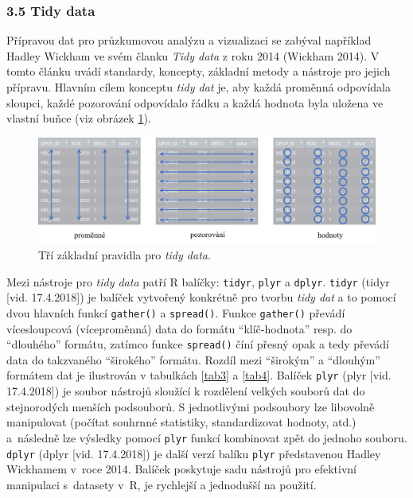 \documentclass[12pt,]{article}
\begin{document}
\hypertarget{tidydata}{\subsubsection{3.5 Tidy data}\label{tidydata}}

\qquad Přípravou dat pro průzkumovou analýzu a vizualizaci se zabýval
například Hadley Wickham ve svém članku \emph{Tidy data} z roku 2014
(Wickham 2014). V tomto článku uvádí standardy, koncepty, základní
metody a nástroje pro jejich přípravu. Hlavním cílem konceptu \emph{tidy
dat} je, aby každá proměnná odpovídala sloupci, každé pozorování
odpovídalo řádku a každá hodnota byla uložena ve vlastní buňce (viz
obrázek \ref{fig:ch3.5}).

\begin{figure}[H]
      \includegraphics[width=\textwidth]{fig/tidy}
      \caption{Tří základní pravidla pro \textit{tidy data}.}
      \label{fig:ch3.5}
\end{figure}

\qquad Mezi nástroje pro \emph{tidy data} patří R balíčky:
\texttt{tidyr}, \texttt{plyr} a \texttt{dplyr}. \texttt{tidyr} (tidyr
{[}vid. 17.4.2018{]}) je balíček vytvořený konkrétně pro tvorbu
\emph{tidy dat} a to pomocí dvou hlavních funkcí \texttt{gather()} a
\texttt{spread()}. Funkce \texttt{gather()} převádí vícesloupcová
(víceproměnná) data do formátu \enquote{klíč-hodnota} resp. do
\enquote{dlouhého} formátu, zatímco funkce \texttt{spread()} číní přesný
opak a tedy převádí data do takzvaného \enquote{širokého} formátu.
Rozdíl mezi \enquote{širokým} a \enquote{dlouhým} formátem dat je
ilustrován v tabulkách \ref{tab3} a \ref{tab4}. Balíček \texttt{plyr}
(plyr {[}vid. 17.4.2018{]}) je soubor nástrojů sloužící k rozdělení
velkých souborů dat do stejnorodých menších podsouborů. S jednotlivými
podsoubory lze libovolně manipulovat (počítat souhrnné statistiky,
standardizovat hodnoty, atd.) a~následně lze výsledky pomocí
\texttt{plyr} funkcí kombinovat zpět do jednoho souboru. \texttt{dplyr}
(dplyr {[}vid. 17.4.2018{]}) je další verzí balíku \texttt{plyr}
představenou Hadley Wickhamem v~roce 2014. Balíček poskytuje sadu
nástrojů pro efektivní manipulaci s~datasety v~R, je rychlejší a
jednodušší na použití. \vspace*{-0.9cm}
\end{document}
